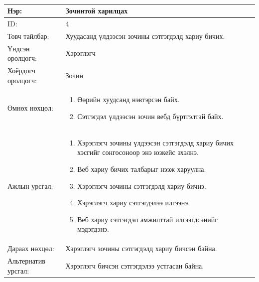 \begin{center}
	\begin{table}[!htbp]
		\caption{}
		\begin{tabular}{|p{4cm}|p{11cm}|}
			\hline
			Нэр: & Зочинтой харилцах \\
			\hline
			ID: & 4 \\
			\hline
			Товч тайлбар: & Хуудасанд үлдээсэн зочины сэтгэгдэлд хариу бичих.  \\
			\hline
			Үндсэн оролцогч: & Хэрэглэгч \\
			\hline
			Хоёрдогч оролцогч: & Зочин  \\
			\hline
			Өмнөх нөхцөл: &  \begin{enumerate}
				\item Өөрийн хуудсанд нэвтэрсэн байх.
				\item Сэтгэгдэл үлдээсэн зочин вебд бүртгэлтэй байх.
			\end{enumerate}
			\\			\hline
			Ажлын урсгал: & \begin{enumerate}
								\item Хэрэглэгч зочины үлдээсэн сэтгэгдэлд хариу бичих хэсгийг сонгосоноор энэ юзкейс эхэлнэ.
								\item Веб хариу бичих талбарыг нээж харуулна.
								\item Хэрэглэгч зочины сэтгэгдэлд хариу бичнэ.
								\item Хэрэглэгч хариу сэтгэгдэлээ илгээнэ.
								\item Веб хариу сэтгэгдэл амжилттай илгээгдсэнийг мэдэгдэнэ.
							\end{enumerate} \\
						\hline
			Дараах нөхцөл: & Хэрэглэгч зочины сэтгэгдэлд хариу бичсэн байна. \\
			\hline
			Альтернатив урсгал: & Хэрэглэгч бичсэн сэтгэгдэлээ устгасан байна. \\
			\hline
		\end{tabular}
	\end{table}
\end{center}

